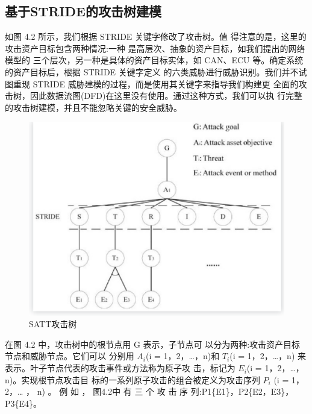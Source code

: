 \subsection{基于STRIDE的攻击树建模}
如图 4.2 所示，我们根据 STRIDE 关键字修改了攻击树。值
得注意的是，这里的攻击资产目标包含两种情况:一种
是高层次、抽象的资产目标，如我们提出的网络模型的
三个层次，另一种是具体的资产目标实体，如 CAN、ECU
等。确定系统的资产目标后，根据 STRIDE 关键字定义
的六类威胁进行威胁识别。我们并不试图重现 STRIDE
威胁建模的过程，而是使用其关键字来指导我们构建更
全面的攻击树，因此数据流图(DFD)在这里没有使用。通过这种方式，我们可以执
行完整的攻击树建模，并且不能忽略关键的安全威胁。
\begin{figure}
    \centering
    \includegraphics[scale=0.5]{resources/img/a14.png}
    \caption{SATT攻击树}
  \end{figure}
\newline
在图 4.2 中，攻击树中的根节点用 G 表示，子节点可
以分为两种:攻击资产目标节点和威胁节点。它们可以
分别用 $A_i$(i = 1，2，…，n)和 $T_i$(i = 1，2，…，n)
来表示。叶子节点代表的攻击事件或方法称为原子攻
击，标记为 $E_i$(i = 1，2，…，n)。实现根节点攻击目
标的一系列原子攻击的组合被定义为攻击序列 $P_i$ (i =
1，2，… ， n) 。 例 如 ， 图4.2中 有 三 个 攻 击 序
列:P1\{E1\}，P2\{E2，E3\}，P3\{E4\}。
